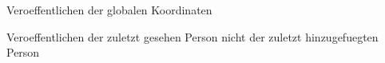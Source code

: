 
\begin{DoxyRefList}
\item[\label{todo__todo000001}%
\hypertarget{todo__todo000001}{}%
Member \hyperlink{classpeople2pose_1_1PeopleRec_a52bbb028f80993699ccd221ac490adb7}{people2pose.People\-Rec.publishposition} ]Veroeffentlichen der globalen Koordinaten 

Veroeffentlichen der zuletzt gesehen Person nicht der zuletzt hinzugefuegten Person 
\end{DoxyRefList}